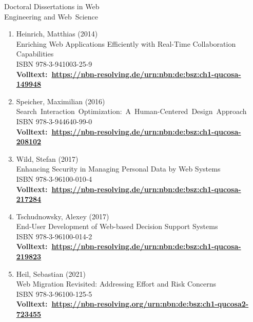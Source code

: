 \cleardoublepage
\pagestyle{empty}
\enlargethispage{2\baselineskip}
{\huge Doctoral Dissertations in Web\\[0.3em]Engineering and Web~Science}

\begin{singlespace}
\begin{enumerate}[label=(\arabic*),align=left,style=multiline,leftmargin=*]
\item Heinrich, Matthias (2014)\\
  Enriching Web Applications Efficiently with Real-Time Collaboration Capabilities\\
  ISBN 978-3-941003-25-9\\
  \textbf{Volltext:~\url{https://nbn-resolving.de/urn:nbn:de:bsz:ch1-qucosa-149948}}\\

\item Speicher, Maximilian (2016)\\
  Search~Interaction~Optimization:~A~Human-Centered~Design~Approach\\
  ISBN 978-3-944640-99-0\\
  \textbf{Volltext:~\url{https://nbn-resolving.de/urn:nbn:de:bsz:ch1-qucosa-208102}}\\

\item Wild, Stefan (2017)\\
  Enhancing Security in Managing Personal Data by Web Systems\\
  ISBN 978-3-96100-010-4\\
  \textbf{Volltext:~\url{https://nbn-resolving.de/urn:nbn:de:bsz:ch1-qucosa-217284}}\\
  
\item Tschudnowsky, Alexey (2017)\\
  End-User Development of Web-based Decision Support Systems\\
  ISBN 978-3-96100-014-2\\
  \textbf{Volltext:~\url{https://nbn-resolving.de/urn:nbn:de:bsz:ch1-qucosa-219823}}\\
  
\item Heil, Sebastian (2021)\\
  Web Migration Revisited: Addressing Effort and Risk Concerns\\
  ISBN 978-3-96100-125-5\\
  \textbf{Volltext:~\url{https://nbn-resolving.org/urn:nbn:de:bsz:ch1-qucosa2-723455}}\\
\end{enumerate}
\end{singlespace}
